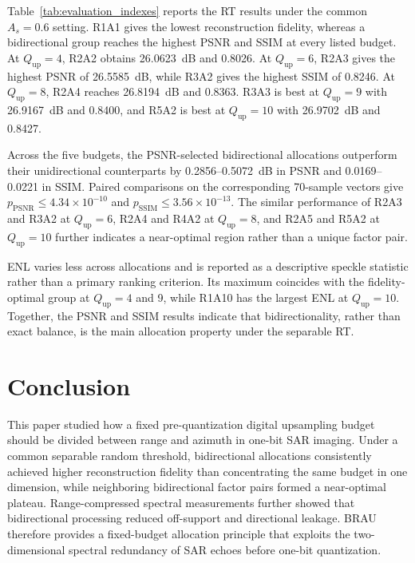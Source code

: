 \documentclass[conference]{IEEEtran}
\begin{document}
Table~\ref{tab:evaluation_indexes} reports the RT results under the common $A_s=0.6$ setting. R1A1 gives the lowest reconstruction fidelity, whereas a bidirectional group reaches the highest PSNR and SSIM at every listed budget. At $Q_{\mathrm{up}}=4$, R2A2 obtains 26.0623~dB and 0.8026. At $Q_{\mathrm{up}}=6$, R2A3 gives the highest PSNR of 26.5585~dB, while R3A2 gives the highest SSIM of 0.8246. At $Q_{\mathrm{up}}=8$, R2A4 reaches 26.8194~dB and 0.8363. R3A3 is best at $Q_{\mathrm{up}}=9$ with 26.9167~dB and 0.8400, and R5A2 is best at $Q_{\mathrm{up}}=10$ with 26.9702~dB and 0.8427.

Across the five budgets, the PSNR-selected bidirectional allocations outperform their unidirectional counterparts by 0.2856--0.5072~dB in PSNR and 0.0169--0.0221 in SSIM. Paired comparisons on the corresponding 70-sample vectors give $p_{\mathrm{PSNR}}\leq4.34\times10^{-10}$ and $p_{\mathrm{SSIM}}\leq3.56\times10^{-13}$. The similar performance of R2A3 and R3A2 at $Q_{\mathrm{up}}=6$, R2A4 and R4A2 at $Q_{\mathrm{up}}=8$, and R2A5 and R5A2 at $Q_{\mathrm{up}}=10$ further indicates a near-optimal region rather than a unique factor pair.

ENL varies less across allocations and is reported as a descriptive speckle statistic rather than a primary ranking criterion. Its maximum coincides with the fidelity-optimal group at $Q_{\mathrm{up}}=4$ and 9, while R1A10 has the largest ENL at $Q_{\mathrm{up}}=10$. Together, the PSNR and SSIM results indicate that bidirectionality, rather than exact balance, is the main allocation property under the separable RT.

\section{Conclusion}

This paper studied how a fixed pre-quantization digital upsampling budget should be divided between range and azimuth in one-bit SAR imaging. Under a common separable random threshold, bidirectional allocations consistently achieved higher reconstruction fidelity than concentrating the same budget in one dimension, while neighboring bidirectional factor pairs formed a near-optimal plateau. Range-compressed spectral measurements further showed that bidirectional processing reduced off-support and directional leakage. BRAU therefore provides a fixed-budget allocation principle that exploits the two-dimensional spectral redundancy of SAR echoes before one-bit quantization.
\end{document}
